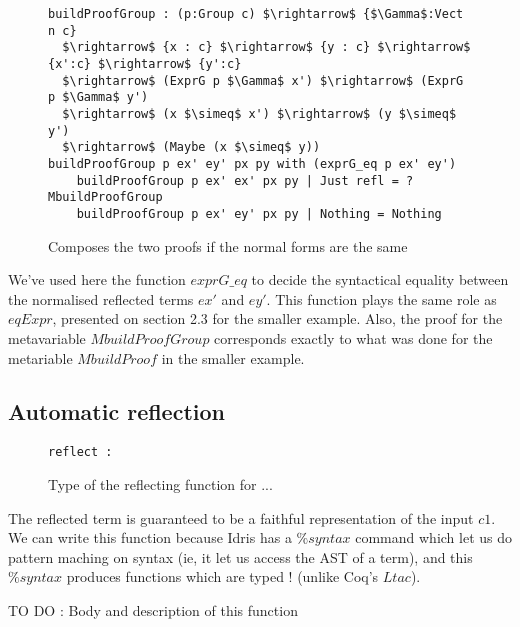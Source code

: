 \begin{figure}[H]
\figrule
\begin{center}
\begin{lstlisting}
buildProofGroup : (p:Group c) $\rightarrow$ {$\Gamma$:Vect n c} 
  $\rightarrow$ {x : c} $\rightarrow$ {y : c} $\rightarrow$ {x':c} $\rightarrow$ {y':c} 
  $\rightarrow$ (ExprG p $\Gamma$ x') $\rightarrow$ (ExprG p $\Gamma$ y') 
  $\rightarrow$ (x $\simeq$ x') $\rightarrow$ (y $\simeq$ y') 
  $\rightarrow$ (Maybe (x $\simeq$ y))
buildProofGroup p ex' ey' px py with (exprG_eq p ex' ey')
    buildProofGroup p ex' ex' px py | Just refl = ?MbuildProofGroup
    buildProofGroup p ex' ey' px py | Nothing = Nothing
\end{lstlisting}
\end{center}
\caption{Composes the two proofs if the normal forms are the same}
\figrule
\end{figure}
We've used here the function $exprG\_eq$ to decide the syntactical equality between the normalised reflected terms $ex'$ and $ey'$. This function plays the same role as $eqExpr$, presented on section 2.3 for the smaller example. Also, the proof for the metavariable $MbuildProofGroup$ corresponds exactly to what was done for the metariable $MbuildProof$ in the smaller example.


\subsection {Automatic reflection}

\begin{figure}[H]
\figrule
\begin{center}
\begin{lstlisting}
reflect : 
\end{lstlisting}
\end{center}
\caption{Type of the reflecting function for ...}
\figrule
\end{figure}

The reflected term is guaranteed to be a faithful representation of the input $c1$. We can write this function because Idris has a $\%syntax$ command which let us do pattern maching on syntax (ie, it let us access the AST of a term), and this $\%syntax$ produces functions which are typed ! (unlike Coq's $Ltac$). 

TO DO : Body and description of this function








